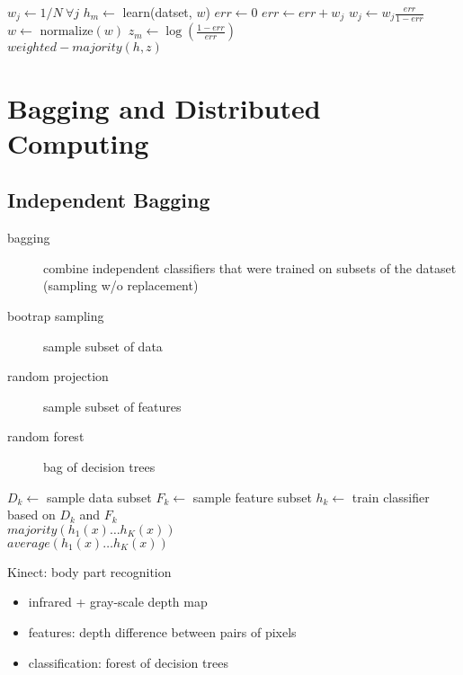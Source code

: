 \documentclass[]{article}
\theoremstyle{definition}
\begin{document}
\begin{algorithmic}
    \State $w_j \gets 1/N \ \forall j $
    \State $h_m \gets$ learn(datset, $w$)
    \State $err \gets 0$
    \State $err \gets err +w_j$
    \EndIf
    \EndFor
    \State $w_j \gets w_j \frac{err}{1-err}$
    \EndIf
    \EndFor
    \State $w \gets \text{ normalize}(w)$
    \State $z_m \gets \log (\frac{1-err}{err})$
    \EndFor \\
    \Return $weighted-majority(h,z)$
\end{algorithmic}

\section{Bagging and Distributed Computing}
\label{sec:bagging_and_distributed_computing}

\subsection{Independent Bagging}
\label{sub:independengt_bagging}
\begin{description}
    \item[bagging] combine independent classifiers that were trained on subsets of the dataset (sampling w/o replacement)
    \item[bootrap sampling] sample subset of data
    \item[random projection] sample subset of features
    \item[random forest] bag of decision trees
\end{description}

\begin{algorithmic}
    \State $D_k \gets$ sample data subset
    \State $F_k \gets$ sample feature subset
    \State $h_k \gets$ train classifier based on $D_k$ and $F_k$
    \EndFor
     \\
    \Return $majority(h_1(x) \ldots h_K(x))$
     \\
    \Return $average(h_1(x) \ldots h_K(x))$
    \EndIf
\end{algorithmic}

Kinect: body part recognition
\begin{itemize}
    \item infrared + gray-scale depth map
    \item features: depth difference between pairs of pixels
    \item classification: forest of decision trees
\end{itemize}
\end{document}

